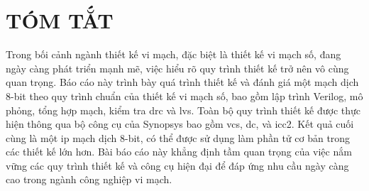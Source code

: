 \chapter*{TÓM TẮT}
\label{Abstract}

Trong bối cảnh ngành thiết kế vi mạch, đặc biệt là thiết kế vi mạch số, đang ngày càng phát triển mạnh mẽ, việc hiểu rõ quy trình thiết kế trở nên vô cùng quan trọng.
Báo cáo này trình bày quá trình thiết kế và đánh giá một mạch dịch 8-bit theo quy trình chuẩn của thiết kế vi mạch số, bao gồm lập trình Verilog, mô phỏng, tổng hợp mạch, kiểm tra \acrfull{drc} và \acrfull{lvs}.
Toàn bộ quy trình thiết kế được thực hiện thông qua bộ công cụ của Synopsys bao gồm \acrfull{vcs}, \acrfull{dc}, và \acrfull{icc2}. 
Kết quả cuối cùng là một \acrfull{ip} mạch dịch 8-bit, có thể được sử dụng làm phần tử cơ bản trong các thiết kế lớn hơn.
Bài báo cáo này khẳng định tầm quan trọng của việc nắm vững các quy trình thiết kế và công cụ hiện đại để đáp ứng nhu cầu ngày càng cao trong ngành công nghiệp vi mạch.